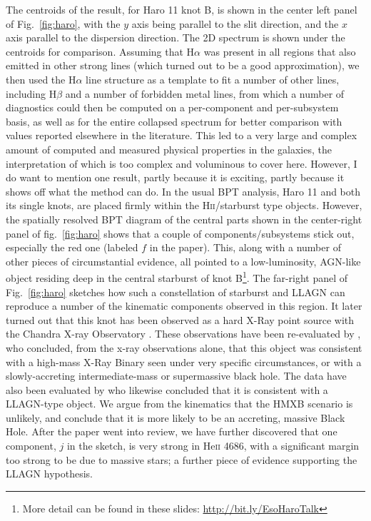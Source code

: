 \documentclass[10pt, letterpaper, headings=Large, DIV=14]{scrartcl}
\begin{document}
The centroids of the result, for Haro 11 knot B, is shown in the center left
panel of Fig.~\ref{fig:haro}, with the $y$ axis being parallel to the slit
direction, and the $x$ axis parallel to the dispersion direction. The 2D
spectrum is shown under the centroids for comparison. Assuming that H$\alpha$
was present in all regions that also emitted in other strong lines (which turned
out to be a good approximation), we then used the H$\alpha$ line structure as a
template to fit a number of other lines, including H$\beta$ and a number of
forbidden metal lines, from which a number of diagnostics could then be computed
on a per-component and per-subsystem basis, as well as for the entire collapsed
spectrum for better comparison with values reported elsewhere in the literature.
This led to a very large and complex amount of computed and measured physical
properties in the galaxies, the interpretation of which is too complex and
voluminous to cover here. However, I do want to mention one result, partly
because it is exciting, partly because it shows off what the method can do. In
the usual BPT analysis, Haro 11 and both its single knots, are placed firmly
within the H\textsc{ii}/starburst type objects. However, the spatially resolved
BPT diagram of the central parts shown in the center-right panel of
fig.~\ref{fig:haro} shows that a couple of components/subsystems stick out,
especially the  red one (labeled $f$ in the paper). This, along with a number of
other pieces of circumstantial evidence, all pointed to a low-luminosity,
AGN-like object residing deep in the central starburst of knot B\footnote{More
detail can be found in these slides: \url{http://bit.ly/EsoHaroTalk}}.  The
far-right panel of Fig.~\ref{fig:haro} sketches how such a constellation of
starburst and LLAGN can reproduce a number of the kinematic components observed
in this region. It later turned out that this knot has been observed as a hard
X-Ray point source with the Chandra X-ray Observatory \citep{Grimes2007}. These
observations have been re-evaluated by \cite{Prestwich2015}, who concluded, from
the x-ray observations alone, that this object was consistent with a high-mass
X-Ray Binary seen under very specific circumstances, or with a slowly-accreting
intermediate-mass or supermassive black hole. The data have also been evaluated
by \cite{BasuZych2016} who likewise concluded that it is consistent with a
LLAGN-type object. We argue from the kinematics that the HMXB scenario is
unlikely, and conclude that it is more likely to be an accreting, massive Black
Hole. After the paper went into review, we have further discovered that one
component, $j$ in the sketch, is very strong in He\textsc{ii} 4686, with a
significant margin too strong to be due to massive stars; a further piece of
evidence supporting the LLAGN hypothesis. 
\end{document}
